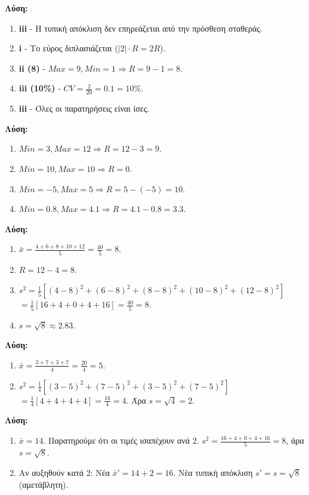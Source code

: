 \documentclass[11pt,a4paper,modern]{FFExercises}
\begin{document}
\askhsh
\textbf{Λύση:}
\begin{enumerate}
    \item \textbf{iii} - Η τυπική απόκλιση δεν επηρεάζεται από την πρόσθεση σταθεράς.
    \item \textbf{i} - Το εύρος διπλασιάζεται ($|2| \cdot R = 2R$).
    \item \textbf{ii (8)} - $Max=9, Min=1 \Rightarrow R = 9-1=8$.
    \item \textbf{iii (10\%)} - $CV = \frac{2}{20} = 0.1 = 10\%$.
    \item \textbf{iii} - Όλες οι παρατηρήσεις είναι ίσες.
\end{enumerate}

\askhsh
\textbf{Λύση:}
\begin{enumerate}
    \item $Min=3, Max=12 \Rightarrow R = 12-3 = 9$.
    \item $Min=10, Max=10 \Rightarrow R = 0$.
    \item $Min=-5, Max=5 \Rightarrow R = 5 - (-5) = 10$.
    \item $Min=0.8, Max=4.1 \Rightarrow R = 4.1 - 0.8 = 3.3$.
\end{enumerate}

\askhsh
\textbf{Λύση:}
\begin{enumerate}
    \item $\bar{x} = \frac{4+6+8+10+12}{5} = \frac{40}{5} = 8$.
    \item $R = 12-4 = 8$.
    \item $s^2 = \frac{1}{5} [(4-8)^2 + (6-8)^2 + (8-8)^2 + (10-8)^2 + (12-8)^2]$
    $= \frac{1}{5} [16 + 4 + 0 + 4 + 16] = \frac{40}{5} = 8$.
    \item $s = \sqrt{8} \approx 2.83$.
\end{enumerate}

\askhsh
\textbf{Λύση:}
\begin{enumerate}
    \item $\bar{x} = \frac{3+7+3+7}{4} = \frac{20}{4} = 5$.
    \item $s^2 = \frac{1}{4} [(3-5)^2 + (7-5)^2 + (3-5)^2 + (7-5)^2]$
    $= \frac{1}{4} [4 + 4 + 4 + 4] = \frac{16}{4} = 4$.
    Άρα $s = \sqrt{4} = 2$.
\end{enumerate}

\askhsh
\textbf{Λύση:}
\begin{enumerate}
    \item $\bar{x} = 14$. Παρατηρούμε ότι οι τιμές ισαπέχουν ανά 2. $s^2 = \frac{16+4+0+4+16}{5} = 8$, άρα $s=\sqrt{8}$.
    \item Αν αυξηθούν κατά 2: Νέα $\bar{x}' = 14+2=16$. Νέα τυπική απόκλιση $s' = s = \sqrt{8}$ (αμετάβλητη).
\end{enumerate}
\end{document}
